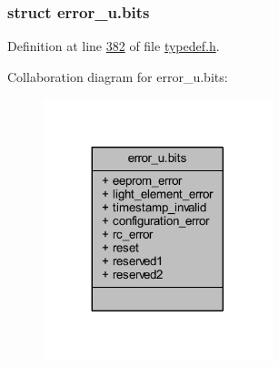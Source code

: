 \subsubsection{struct error\+\_\+u.\+bits}


Definition at line \hyperlink{a00001_source_l00382}{382} of file \hyperlink{a00001_source}{typedef.\+h}.



Collaboration diagram for error\+\_\+u.\+bits\+:
\nopagebreak
\begin{figure}[H]
\begin{center}
\leavevmode
\includegraphics[width=188pt]{d1/dd4/a00267}
\end{center}
\end{figure}
